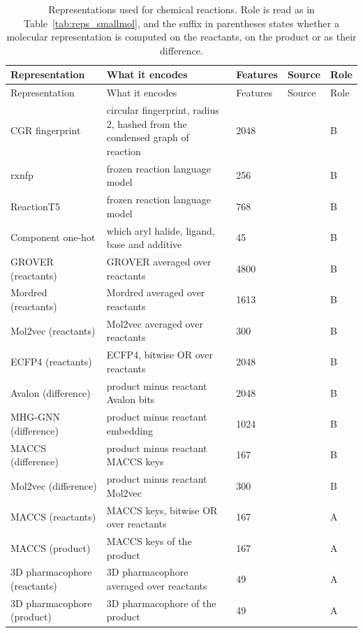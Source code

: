 {\let\small\footnotesize
\begin{longtable}{P{3.0cm}P{5.0cm}P{1.5cm}P{1.5cm}P{1.4cm}}
\caption[Representations used for chemical reactions.]{Representations used for chemical reactions. Role is read as in Table~\ref{tab:reps_smallmol}, and the suffix in parentheses states whether a molecular representation is computed on the reactants, on the product or as their difference.}\label{tab:reps_reactions}\\
\toprule
Representation & What it encodes & Features & Source & Role \\
\midrule
\endfirsthead
\toprule
Representation & What it encodes & Features & Source & Role \\
\midrule
\endhead
\bottomrule
\endfoot
CGR fingerprint & circular fingerprint, radius 2, hashed from the condensed graph of reaction & 2048 & \citep{Varnek2005, Hoonakker2011} & B \\
rxnfp & frozen reaction language model & 256 & \citep{Schwaller2021rxnfp} & B \\
ReactionT5 & frozen reaction language model & 768 & \citep{Sagawa2023ReactionT5} & B \\
Component one-hot & which aryl halide, ligand, base and additive & 45 & \citep{Ahneman2018} & B \\
GROVER (reactants) & GROVER averaged over reactants & 4800 & \citep{Rong2020GROVER} & B \\
Mordred (reactants) & Mordred averaged over reactants & 1613 & \citep{Moriwaki2018} & B \\
Mol2vec (reactants) & Mol2vec averaged over reactants & 300 & \citep{Jaeger2018} & B \\
ECFP4 (reactants) & ECFP4, bitwise OR over reactants & 2048 & \citep{rogers2010} & B \\
Avalon (difference) & product minus reactant Avalon bits & 2048 & \citep{Gedeck2006} & B \\
MHG-GNN (difference) & product minus reactant embedding & 1024 & \citep{kishimoto2023} & B \\
MACCS (difference) & product minus reactant MACCS keys & 167 & \citep{Durant2002} & B \\
Mol2vec (difference) & product minus reactant Mol2vec & 300 & \citep{Jaeger2018} & B \\
MACCS (reactants) & MACCS keys, bitwise OR over reactants & 167 & \citep{Durant2002} & A \\
MACCS (product) & MACCS keys of the product & 167 & \citep{Durant2002} & A \\
3D pharmacophore (reactants) & 3D pharmacophore averaged over reactants & 49 & \citep{rdkit} & A \\
3D pharmacophore (product) & 3D pharmacophore of the product & 49 & \citep{rdkit} & A \\
\end{longtable}}

